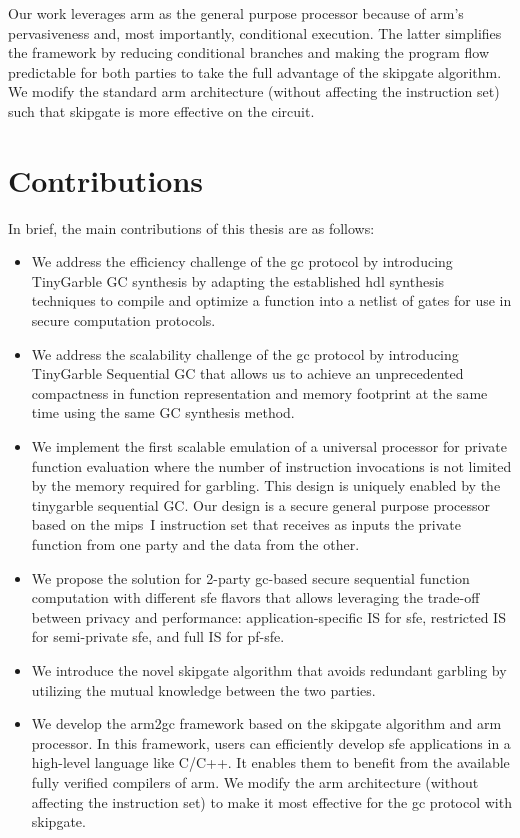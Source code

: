 Our work leverages \gls{arm} as the general purpose processor because of \gls{arm}'s pervasiveness and, most importantly, conditional execution.
The latter simplifies the framework by reducing conditional branches and making the program flow predictable for both parties to take the full advantage of the \gls{skipgate} algorithm.
We modify the standard \gls{arm} architecture (without affecting the instruction set) such that \gls{skipgate} is more effective on the circuit.

\section{Contributions}
In brief, the main contributions of this thesis are as follows:
\begin{itemize}
  \item
  We address the efficiency challenge of the gc protocol by introducing TinyGarble GC synthesis by adapting the established \acrshort{hdl} synthesis techniques to compile and optimize a function into a netlist of gates for use in secure computation protocols.
  \item
  We address the scalability challenge of the gc protocol by introducing TinyGarble Sequential GC that allows us to achieve an unprecedented compactness in function representation and memory footprint at the same time using the same GC synthesis method.

  \item
  We implement the first scalable emulation of a universal processor for private function evaluation where the number of instruction invocations is not limited by the memory required for garbling.
  This design is uniquely enabled by the \gls{tinygarble} sequential GC.
  Our design is a secure general purpose processor based on the \gls{mips}~I instruction set that receives as inputs the private function from one party and the data from the other.

  \item
  We propose the solution for 2-party \acrshort{gc}-based secure sequential function computation with different \acrshort{sfe} flavors that allows leveraging the trade-off between privacy and performance: application-specific IS for \acrshort{sfe}, restricted IS for semi-private \acrshort{sfe}, and full IS for \acrshort{pf-sfe}.

  \item We introduce the novel \gls{skipgate} algorithm that avoids redundant garbling by utilizing the mutual knowledge between the two parties.

  \item
  We develop the \gls{arm2gc} framework based on the \gls{skipgate} algorithm and \gls{arm} processor.
  In this framework, users can efficiently develop \acrshort{sfe} applications in a high-level language like C/C++.
  It enables them to benefit from the available fully verified compilers of \gls{arm}.
  We modify the \gls{arm} architecture (without affecting the instruction set) to make it most effective for the \acrshort{gc} protocol with \gls{skipgate}.
\end{itemize}


